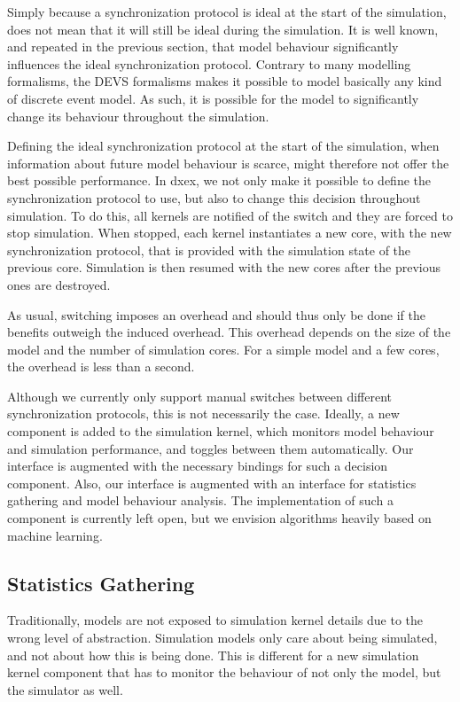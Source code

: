 Simply because a synchronization protocol is ideal at the start of the simulation, does not mean that it will still be ideal during the simulation.
It is well known, and repeated in the previous section, that model behaviour significantly influences the ideal synchronization protocol.
Contrary to many modelling formalisms, the DEVS formalisms makes it possible to model basically any kind of discrete event model.
As such, it is possible for the model to significantly change its behaviour throughout the simulation.

Defining the ideal synchronization protocol at the start of the simulation, when information about future model behaviour is scarce, might therefore not offer the best possible performance.
In dxex, we not only make it possible to define the synchronization protocol to use, but also to change this decision throughout simulation.
To do this, all kernels are notified of the switch and they are forced to stop simulation.
When stopped, each kernel instantiates a new core, with the new synchronization protocol, that is provided with the simulation state of the previous core.
Simulation is then resumed with the new cores after the previous ones are destroyed.

As usual, switching imposes an overhead and should thus only be done if the benefits outweigh the induced overhead.
This overhead depends on the size of the model and the number of simulation cores.
For a simple model and a few cores, the overhead is less than a second.

Although we currently only support manual switches between different synchronization protocols, this is not necessarily the case.
Ideally, a new component is added to the simulation kernel, which monitors model behaviour and simulation performance, and toggles between them automatically.
Our interface is augmented with the necessary bindings for such a decision component.
Also, our interface is augmented with an interface for statistics gathering and model behaviour analysis.
The implementation of such a component is currently left open, but we envision algorithms heavily based on machine learning.

\subsection{Statistics Gathering}
Traditionally, models are not exposed to simulation kernel details due to the wrong level of abstraction.
Simulation models only care about being simulated, and not about how this is being done.
This is different for a new simulation kernel component that has to monitor the behaviour of not only the model, but the simulator as well.

